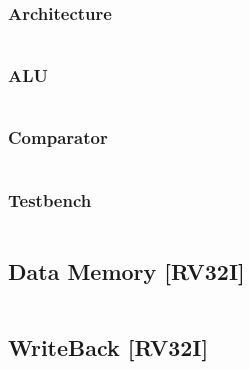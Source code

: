 \subsubsection{Architecture}
\begin{code}
\label{code:IE_code}  
\inputminted[fontsize=\footnotesize]{vhdl}{\srcfolder instr_exec.vhd}
\end{code}

\subsubsection{ALU}
\begin{code}
\label{code:IE_ALU}  
\inputminted[fontsize=\footnotesize]{vhdl}{\srcfolder ALU.vhd}
\end{code}
\newpage


\subsubsection{Comparator}
\begin{code}
\label{code:IE_comparator}  
\inputminted[fontsize=\footnotesize]{vhdl}{\srcfolder comparator.vhd}
\end{code}
\newpage


\subsubsection{Testbench}
\begin{code}
\label{code:IE_TB}  
\inputminted[fontsize=\footnotesize]{vhdl}{\simfolder IE_testbench.vhd}
\end{code}
\newpage


\subsection{Data Memory [RV32I]}
\begin{code}
\label{code:DM_code}  
\inputminted[fontsize=\footnotesize]{vhdl}{\srcfolder data_memory.vhd}
\end{code}


\subsection{WriteBack [RV32I]}
\begin{code}
\label{code:WB_code}  
\inputminted[fontsize=\footnotesize]{vhdl}{\srcfolder write_back.vhd}
\end{code}

